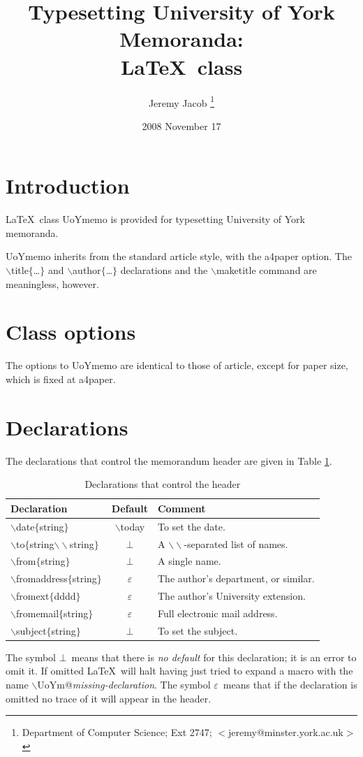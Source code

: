 \documentclass[12pt,a4paper]{article}
\title{Typesetting University of York Memoranda:\\
                \LaTeX\ class \cmdsty{UoYmemo}}
\author{Jeremy Jacob
        \thanks{Department of Computer Science;
                Ext 2747; $<$jeremy@minster.york.ac.uk$>$}}
\date{2008 November 17}
\newcommand{\cmdsty}[1]{\textsf{#1}}
\newcommand{\cmd}[1]{\cmdsty{$\backslash$#1}}
\newcommand{\pcmd}[2]{\cmdsty{\cmd{#1}$\{$#2$\}$}}
\newcommand{\nl}{\ensuremath{\backslash\backslash}}
\newcommand{\error}{\ensuremath{\bot}}
\newcommand{\none}{\ensuremath{\varepsilon}}
\begin{document}
\maketitle

\section{Introduction}\label{Intro:Sec}
\LaTeX\ class \cmdsty{UoYmemo} is provided for typesetting
University of York memoranda.

\cmdsty{UoYmemo} inherits from the standard \cmdsty{article} style,
with the \cmdsty{a4paper} option.  The \pcmd{title}{\ldots} and
\pcmd{author}{\ldots} declarations and the \cmd{maketitle} command are
meaningless, however.

\section{Class options}\label{ClOpts:Sec}
The options to \cmdsty{UoYmemo} are identical to those of
\cmdsty{article}, except for paper size, which is fixed at
\cmdsty{a4paper}.

\section{Declarations}

The declarations that control the memorandum header are given in Table
\ref{Decls:Table}.
\begin{table}[p]
\begin{center}
\begin{tabular}{|l|c|l|}
\hline
Declaration&Default&Comment\\\hline
\pcmd{date}{string}&\cmd{today}&To set the date.\\
\pcmd{to}{string\nl string}&\error&A \nl-separated list of names.\\
\pcmd{from}{string}&\error&A single name.\\
\pcmd{fromaddress}{string}&\none&The author's department, or similar.\\
\pcmd{fromext}{dddd}&\none&The author's University extension.\\
\pcmd{fromemail}{string}&\none&Full electronic mail address.\\
\pcmd{subject}{string}&\error&To set the subject.\\\hline
\end{tabular}
\end{center}
\caption{Declarations that control the header}\label{Decls:Table}
\end{table}
The symbol \error\ means that there is \emph{no default} for this
declaration; it is an error to omit it.  If omitted \LaTeX\ will halt
having just tried to expand a macro with the name
\cmd{UoYm@}\emph{missing-declaration}.  The symbol \none\ means that
if the declaration is omitted no trace of it will appear in the
header.
\end{document}
